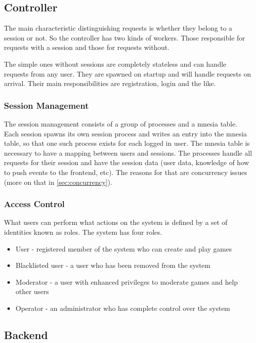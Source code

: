 \documentclass[11pt,a4paper]{report}
\begin{document}
\subsection{Controller}
The main characteristic distinguishing requests is whether they belong to a session or not.
So the controller has two kinds of workers.
Those responsible for requests with a session and those for requests without.

The simple ones without sessions are completely stateless and can handle requests from any user.
They are spawned on startup and will handle requests on arrival.
Their main responsibilities are registration, login and the like.

\subsubsection{Session Management}
The session management consists of a group of processes and a mnesia table.
Each session spawns its own session process and writes an entry into the mnesia table,
so that one such process exists for each logged in user.
The mnesia table is necessary to have a mapping between users and sessions.
The processes handle all requests for their session and have the session data
(user data, knowledge of how to push events to the frontend, etc).
The reasons for that are concurrency issues (more on that in \ref{sec:concurrency}).


\subsubsection{Access Control}
What users can perform what actions on the system is defined by a set of identities known as roles. The system has four roles.

\begin{itemize}
\item User - registered member of the system who can create and play games
\item Blacklisted user - a user who has been removed from the system
\item Moderator - a user with enhanced privileges to moderate games and help other users
\item Operator - an administrator who has complete control over the system

\end{itemize}

\subsection{Backend}
\end{document}
